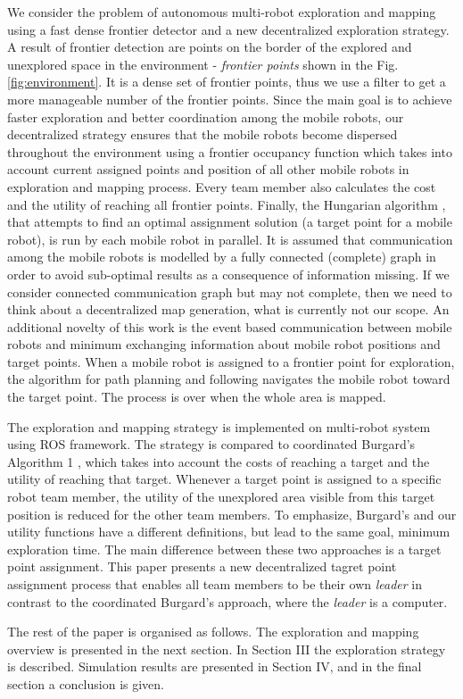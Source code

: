 We consider the problem of autonomous multi-robot exploration and mapping using a fast dense frontier detector and a new decentralized exploration strategy. A result of frontier detection are points on the border of the explored and unexplored space in the environment - \textit{frontier points} shown in the Fig. \ref{fig:environment}. It is a dense set of frontier points, thus we use a filter to get a more manageable number of the frontier points. Since the main goal is to achieve faster exploration and better coordination among the mobile robots, our decentralized strategy ensures that the mobile robots become dispersed throughout the environment using a frontier occupancy function which takes into account current assigned points and position of all other mobile robots in exploration and mapping process. Every team member also calculates the cost and the utility of reaching all frontier points. Finally, the Hungarian algorithm \cite{Kuhn1955}, that attempts to find an optimal assignment solution (a target point for a mobile robot), is run by each mobile robot in parallel. It is assumed that communication among the mobile robots is modelled by a fully connected (complete) graph in order to avoid sub-optimal results as a consequence of information missing. 
If we consider connected communication graph but may not complete, then we need to think about a decentralized map generation, what is currently not our scope. An additional novelty of this work is the event based communication between mobile robots and minimum exchanging information about mobile robot positions and target points.  When a mobile robot is assigned to a frontier point for exploration, the algorithm for path planning and following navigates the mobile robot toward the target point. The process is over when the whole area is mapped.

The exploration and mapping strategy is implemented on multi-robot system using ROS framework. The strategy is compared to coordinated Burgard's Algorithm 1 \cite{Burgard2005}, which takes into account the costs of reaching a target and the utility of reaching that target. Whenever a target point is assigned to a specific robot team member, the utility of the unexplored area visible from this target position is reduced for the other team members. To emphasize, Burgard's and our utility functions have a different definitions, but lead to the same goal, minimum exploration time. The main difference between these two approaches is a target point assignment. This paper presents a new decentralized tagret point assignment process that enables all team members to be their own  \emph{leader} in contrast to the coordinated Burgard's approach, where the  \emph{leader} is a computer.

The rest of the paper is organised as follows. The exploration and mapping overview is presented in the next section. In Section III the exploration strategy is described. Simulation results are presented in Section IV, and in the final section a conclusion is given.
